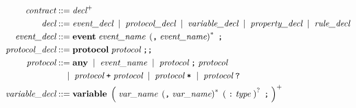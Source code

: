 \documentclass[preview=true]{standalone}
\newcommand{\token}[1]{\textbf{#1}}
\begin{document}
\begin{table}[t]
\newcommand\metasym[1]{{\color{blue}#1}}
\begin{align*}
  \textit{contract} &::= \textit{decl}^+
  \\
  \textit{decl} &::=
    \textit{event\_decl}
    \;\mid\; \textit{protocol\_decl}
    \;\mid\; \textit{variable\_decl}
    \;\mid\; \textit{property\_decl}
    \;\mid\; \textit{rule\_decl}
  \\
  \medskip
  \textit{event\_decl} &::=
    \token{event}\;
      \textit{event\_name}\;
      \left(\texttt{,}\; \textit{event\_name}\right)^\ast\; \texttt{;}
  \\
  \textit{protocol\_decl} &::=
  \token{protocol}\;
   \textit{protocol}\; \texttt{;;}
  \\
  \textit{protocol} &::=
  \token{any}\;
  \mid\;
  \textit{event\_name}\;
  \mid\;
  \textit{protocol}\; \texttt{;}\; \textit{protocol}\;
  \\&\quad
  \mid\;
  \textit{protocol}\; \texttt{+}\; \textit{protocol}\;
  \mid\;
  \textit{protocol}\; \texttt{*}\;
  \mid\;
  \textit{protocol}\; \texttt{?}\;
  \\
  \textit{variable\_decl} &::=
  \token{variable}\;
    \left(\;
    \textit{var\_name}\;
    \left(\texttt{,}\; \textit{var\_name}\right)^\ast\;
    \left(\;
    \texttt{:}\; \textit{type}\;
    \right)^?\;
    \texttt{;}\;
    \right)^+
  \\

\end{align*}
\end{table}
\end{document}
